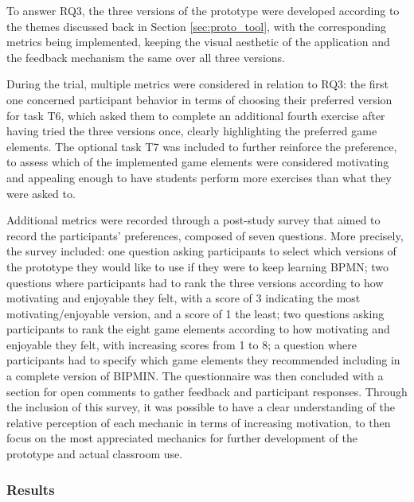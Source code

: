 To answer RQ3, the three versions of the prototype were developed according to the themes discussed back in Section \ref{sec:proto_tool}, with the corresponding metrics being implemented, keeping the visual aesthetic of the application and the feedback mechanism the same over all three versions.

During the trial, multiple metrics were considered in relation to RQ3: the first one concerned participant behavior in terms of choosing their preferred version for task T6, which asked them to complete an additional fourth exercise after having tried the three versions once, clearly highlighting the preferred game elements. The optional task T7 was included to further reinforce the preference, to assess which of the implemented game elements were considered motivating and appealing enough to have students perform more exercises than what they were asked to.

Additional metrics were recorded through a post-study survey that aimed to record the participants' preferences, composed of seven questions. More precisely, the survey included: one question asking participants to select which versions of the prototype they would like to use if they were to keep learning BPMN; two questions where participants had to rank the three versions according to how motivating and enjoyable they felt, with a score of 3 indicating the most motivating/enjoyable version, and a score of 1 the least; two questions asking participants to rank the eight game elements according to how motivating and enjoyable they felt, with increasing scores from 1 to 8; a question where participants had to specify which game elements they recommended including in a complete version of BIPMIN. The questionnaire was then concluded with a section for open comments to gather feedback and participant responses. Through the inclusion of this survey, it was possible to have a clear understanding of the relative perception of each mechanic in terms of increasing motivation, to then focus on the most appreciated mechanics for further development of the prototype and actual classroom use. 


\subsubsection{Results}

